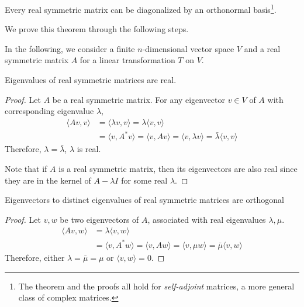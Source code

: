 





\maketitle

\begin{theorem*}
	Every real symmetric matrix can be diagonalized by an orthonormal basis\footnote{The theorem and the proofs all hold for \emph{self-adjoint} matrices, a more general class of complex matrices.}.
\end{theorem*}

We prove this theorem through the following steps.

In the following, we consider a finite $n$-dimensional vector space $V$ and a real symmetric matrix $A$ for a linear transformation $T$ on $V$.

\begin{theorem}
\label{thm-1}
	Eigenvalues of real symmetric matrices are real.
\end{theorem}

\begin{proof}

Let $A$ be a real symmetric matrix. For any eigenvector $v \in V$ of $A$ with corresponding eigenvalue $\lambda$,
\begin{align*}
	\langle Av,v \rangle &= \langle \lambda v,v \rangle = \lambda \langle v, v \rangle \\
	&=\langle v, A^*v\rangle = \langle v, Av \rangle = \langle v,\lambda v \rangle = \bar \lambda \langle v,v \rangle
\end{align*}
Therefore, $\lambda = \bar \lambda$, $\lambda$ is real.

Note that if $A$ is a real symmetric matrix, then its eigenvectors are also real since they are in the kernel of $A-\lambda I$ for some real $\lambda$.

\end{proof}

\begin{theorem}
	Eigenvectors to distinct eigenvalues of real symmetric matrices are orthogonal
\end{theorem}

\begin{proof}

	Let $v, w$ be two eigenvectors of $A$, associated with real eigenvalues $\lambda,\mu$.
\begin{align*}
	\langle Av,w \rangle &= \lambda \langle v,w \rangle \\
	&= \langle v,A^*w \rangle = \langle v,Aw \rangle = \langle v,\mu w \rangle = \bar \mu \langle v,w \rangle
\end{align*}
Therefore, either $\lambda = \bar \mu = \mu$ or $\langle v,w\rangle = 0$.

\end{proof}


